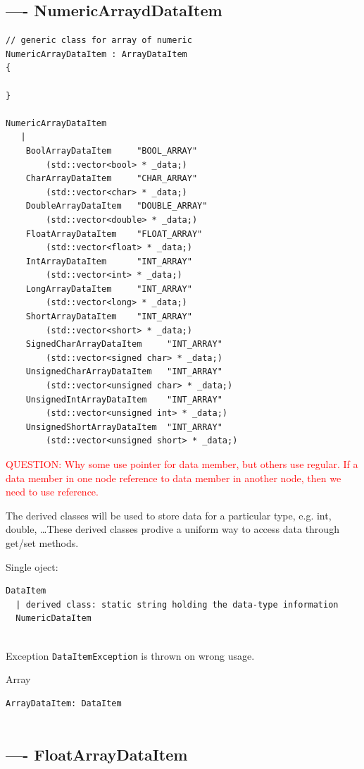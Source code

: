 \subsection{---- NumericArraydDataItem}
\label{sec:NumericArrayDataItem}

\begin{verbatim}
// generic class for array of numeric
NumericArrayDataItem : ArrayDataItem
{

}

NumericArrayDataItem
   |
    BoolArrayDataItem     "BOOL_ARRAY"
        (std::vector<bool> * _data;)
    CharArrayDataItem     "CHAR_ARRAY"
        (std::vector<char> * _data;)
    DoubleArrayDataItem   "DOUBLE_ARRAY"
        (std::vector<double> * _data;)
    FloatArrayDataItem    "FLOAT_ARRAY"
        (std::vector<float> * _data;)
    IntArrayDataItem      "INT_ARRAY"
        (std::vector<int> * _data;)
    LongArrayDataItem     "INT_ARRAY"
        (std::vector<long> * _data;)
    ShortArrayDataItem    "INT_ARRAY" 
        (std::vector<short> * _data;)
    SignedCharArrayDataItem     "INT_ARRAY"
        (std::vector<signed char> * _data;)
    UnsignedCharArrayDataItem   "INT_ARRAY"
        (std::vector<unsigned char> * _data;)
    UnsignedIntArrayDataItem    "INT_ARRAY"
        (std::vector<unsigned int> * _data;)
    UnsignedShortArrayDataItem  "INT_ARRAY"
        (std::vector<unsigned short> * _data;)

\end{verbatim}

\textcolor{red}{QUESTION: Why some use pointer for data member, but others use
regular. If a data member in one node reference to data member in another
node, then we need to use reference.}

The derived classes will be used to store data for a particular type, e.g. int,
double, \ldots These derived classes prodive a uniform way to access data
through get/set methods. 


Single oject: 
\begin{verbatim}
DataItem
  | derived class: static string holding the data-type information
  NumericDataItem
  
\end{verbatim}
Exception \verb!DataItemException! is thrown on wrong
usage.

Array
\begin{verbatim}
ArrayDataItem: DataItem


\end{verbatim}

\subsection{---- FloatArrayDataItem}
\label{sec:FloatArrayDataItem}

